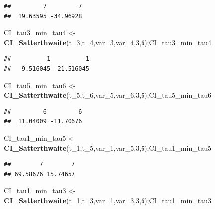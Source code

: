 \documentclass[12pt,]{article}
\newenvironment{Shaded}{\begin{snugshade}}{\end{snugshade}}
\newcommand{\KeywordTok}[1]{\textcolor[rgb]{0.13,0.29,0.53}{\textbf{#1}}}
\newcommand{\DecValTok}[1]{\textcolor[rgb]{0.00,0.00,0.81}{#1}}
\newcommand{\StringTok}[1]{\textcolor[rgb]{0.31,0.60,0.02}{#1}}
\newcommand{\NormalTok}[1]{#1}
\begin{document}
\begin{verbatim}
##         7         7 
##  19.63595 -34.96928
\end{verbatim}

\begin{Shaded}
\begin{Highlighting}[]
\NormalTok{CI_tau3_min_tau4 <-}\StringTok{ }\KeywordTok{CI_Satterthwaite}\NormalTok{(t_}\DecValTok{3}\NormalTok{,t_}\DecValTok{4}\NormalTok{,var_}\DecValTok{3}\NormalTok{,var_}\DecValTok{4}\NormalTok{,}\DecValTok{3}\NormalTok{,}\DecValTok{6}\NormalTok{);CI_tau3_min_tau4 }
\end{Highlighting}
\end{Shaded}

\begin{verbatim}
##          1          1 
##   9.516045 -21.516045
\end{verbatim}

\begin{Shaded}
\begin{Highlighting}[]
\NormalTok{CI_tau5_min_tau6 <-}\StringTok{ }\KeywordTok{CI_Satterthwaite}\NormalTok{(t_}\DecValTok{5}\NormalTok{,t_}\DecValTok{6}\NormalTok{,var_}\DecValTok{5}\NormalTok{,var_}\DecValTok{6}\NormalTok{,}\DecValTok{3}\NormalTok{,}\DecValTok{6}\NormalTok{);CI_tau5_min_tau6}
\end{Highlighting}
\end{Shaded}

\begin{verbatim}
##         6         6 
##  11.04009 -11.70676
\end{verbatim}

\begin{Shaded}
\begin{Highlighting}[]
\NormalTok{CI_tau1_min_tau5 <-}\StringTok{ }\KeywordTok{CI_Satterthwaite}\NormalTok{(t_}\DecValTok{1}\NormalTok{,t_}\DecValTok{5}\NormalTok{,var_}\DecValTok{1}\NormalTok{,var_}\DecValTok{5}\NormalTok{,}\DecValTok{3}\NormalTok{,}\DecValTok{6}\NormalTok{);CI_tau1_min_tau5}
\end{Highlighting}
\end{Shaded}

\begin{verbatim}
##        7        7 
## 69.58676 15.74657
\end{verbatim}

\begin{Shaded}
\begin{Highlighting}[]
\NormalTok{CI_tau1_min_tau3 <-}\StringTok{ }\KeywordTok{CI_Satterthwaite}\NormalTok{(t_}\DecValTok{1}\NormalTok{,t_}\DecValTok{3}\NormalTok{,var_}\DecValTok{1}\NormalTok{,var_}\DecValTok{3}\NormalTok{,}\DecValTok{3}\NormalTok{,}\DecValTok{6}\NormalTok{);CI_tau1_min_tau3}
\end{Highlighting}
\end{Shaded}
\end{document}

